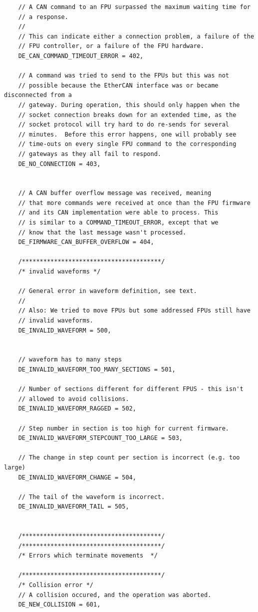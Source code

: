 \documentclass[fontsize=12,a4paper]{scrreprt}
\begin{document}
\begin{verbatim}
    // A CAN command to an FPU surpassed the maximum waiting time for
    // a response.
    //
    // This can indicate either a connection problem, a failure of the
    // FPU controller, or a failure of the FPU hardware.
    DE_CAN_COMMAND_TIMEOUT_ERROR = 402,

    // A command was tried to send to the FPUs but this was not
    // possible because the EtherCAN interface was or became disconnected from a
    // gateway. During operation, this should only happen when the
    // socket connection breaks down for an extended time, as the
    // socket protocol will try hard to do re-sends for several
    // minutes.  Before this error happens, one will probably see
    // time-outs on every single FPU command to the corresponding
    // gateways as they all fail to respond.
    DE_NO_CONNECTION = 403,


    // A CAN buffer overflow message was received, meaning
    // that more commands were received at once than the FPU firmware
    // and its CAN implementation were able to process. This
    // is similar to a COMMAND_TIMEOUT_ERROR, except that we
    // know that the last message wasn't processed.
    DE_FIRMWARE_CAN_BUFFER_OVERFLOW = 404,

    /***************************************/
    /* invalid waveforms */

    // General error in waveform definition, see text.
    //
    // Also: We tried to move FPUs but some addressed FPUs still have
    // invalid waveforms.
    DE_INVALID_WAVEFORM = 500,


    // waveform has to many steps
    DE_INVALID_WAVEFORM_TOO_MANY_SECTIONS = 501,

    // Number of sections different for different FPUS - this isn't
    // allowed to avoid collisions.
    DE_INVALID_WAVEFORM_RAGGED = 502,

    // Step number in section is too high for current firmware.
    DE_INVALID_WAVEFORM_STEPCOUNT_TOO_LARGE = 503,

    // The change in step count per section is incorrect (e.g. too large)
    DE_INVALID_WAVEFORM_CHANGE = 504,

    // The tail of the waveform is incorrect.
    DE_INVALID_WAVEFORM_TAIL = 505,


    /***************************************/
    /***************************************/
    /* Errors which terminate movements  */

    /***************************************/
    /* Collision error */
    // A collision occured, and the operation was aborted.
    DE_NEW_COLLISION = 601,


\end{verbatim}
\end{document}

